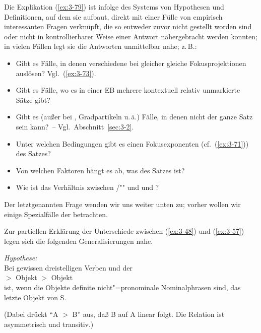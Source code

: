 \documentclass[output=paper]{langsci/langscibook}
\begin{document}
Die Explikation (\ref{ex:3-79}) ist infolge des Systems von Hypothesen und
Definitionen, auf dem sie aufbaut, direkt mit einer Fülle von
empirisch interessanten Fragen verknüpft, die so entweder zuvor nicht
gestellt worden sind oder nicht in kontrollierbarer Weise einer
Antwort nähergebracht werden konnten; in vielen Fällen legt sie die
Antworten unmittelbar nahe; z.\,B.:
\begin{itemize}
\item Gibt es Fälle, in denen verschiedene  bei
  gleicher  gleiche Fokusprojektionen auslösen? Vgl.\ (\ref{ex:3-73}).
\item Gibt es Fälle, wo es in einer EB mehrere kontextuell relativ
  unmarkierte Sätze gibt?
\item Gibt es (außer bei , Gradpartikeln u.\,ä.) Fälle, in
  denen nicht der ganze Satz  sein kann?~-- Vgl.\ Abschnitt~\ref{sec:3-2}.
\item Unter welchen Bedingungen gibt es einen Fokusexponenten
  (cf.\ (\ref{ex:3-71})) des Satzes?
\item Von welchen Faktoren hängt es ab, was  des Satzes ist?
\item Wie ist das Verhältnis zwischen /"" und  und ?
\end{itemize}
Der letztgenannten Frage wenden wir uns weiter unten zu; vorher wollen
wir einige Spezialfälle der  betrachten.

Zur partiellen Erklärung der Unterschiede zwischen (\ref{ex:3-48}) und (\ref{ex:3-57}) legen
sich die folgenden Generalisierungen nahe.
\begin{exe}
\ex
\label{ex:3-103}
\textit{Hypothese:}\\
Bei gewissen dreistelligen Verben und der \\
\hphantom{Bei gewiss}  $>$ Objekt $>$ Objekt\\
ist, wenn die Objekte definite nicht"=pronominale Nominalphrasen sind,
das letzte Objekt  von S.
\end{exe}
(Dabei drückt "`A $>$ B"' aus, daß B auf A linear folgt. Die Relation
ist asymmetrisch und transitiv.)
\end{document}
